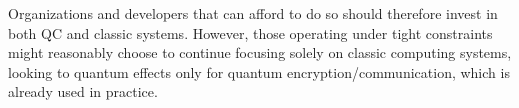 Organizations and developers that can afford to do so should therefore
invest in both QC and classic systems.
However, those operating under tight constraints might reasonably choose
to continue focusing solely on classic computing systems, looking to
quantum effects only for quantum encryption/communication, which is
already used in practice.

